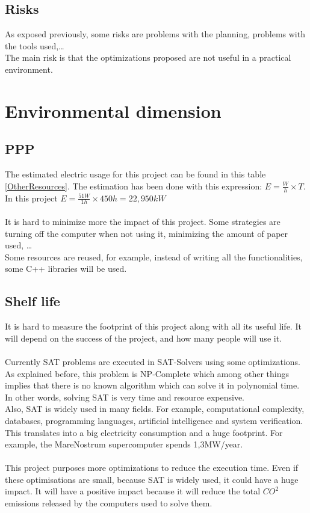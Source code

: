 \subsection{Risks}
As exposed previously, some risks are problems with the planning, problems with the tools used,\ldots\\
The main risk is that the optimizations proposed are not useful in a practical environment. 

\section{Environmental dimension}
\subsection{PPP}
The estimated electric usage for this project can be found in this table \ref{OtherResources}. The estimation has been done with this expression: $E=\frac{W}{h} \times T$. In this project $E=\frac{51W}{1h}\times 450h = 22,950kW$\\\\
It is hard to minimize more the impact of this project. Some strategies are turning off the computer when not using it, minimizing the amount of paper used, \ldots\\
Some resources are reused, for example, instead of writing all the functionalities, some C++ libraries will be used.
\subsection{Shelf life}
It is hard to measure the footprint of this project along with all its useful life. It will depend on the success of the project, and how many people will use it. \\\\
Currently SAT problems are executed in SAT-Solvers using some optimizations. As explained before, this problem is NP-Complete which among other things implies that there is no known algorithm which can solve it in polynomial time. In other words, solving SAT is very time and resource expensive. \\
Also, SAT is widely used in many fields. For example, computational complexity, databases, programming languages, artificial intelligence and system verification. This translates into a big electricity consumption and a huge footprint. For example, the MareNostrum\cite{MareNostrum} supercomputer spends 1,3MW/year. \\\\
This project purposes more optimizations to reduce the execution time. Even if these optimisations are small, because SAT is widely used, it could have a huge impact. It will have a positive impact because it will reduce the total $CO^2$ emissions released by the computers used to solve them.

